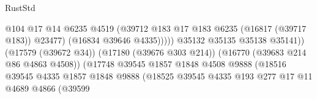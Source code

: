 \begin{lexlean}{RustStd}
\begin{coremodule}
                                                            @104
                                                            @17
                                                            @14
                                                            @6235
                                                            @4519
                                                            (@39712
                                                              @183
                                                              @17
                                                              @183
                                                              @6235
                                                              (@16817 (@39717 @183))
                                                              @23477)
                                                            (@16834 @39646 @4335)))))
                                                    @35132
                                                    @35135
                                                    @35138
                                                    @35141))
                                                (@17579 (@39672 @34))
                                                (@17180 (@39676 @303 @214))
                                                (@16770 (@39683 @214 @86 @4863 @4508))
                                                (@17748
                                                  @39545
                                                  @1857
                                                  @1848
                                                  @4508
                                                  @9888
                                                  (@18516
                                                    @39545
                                                    @4335
                                                    @1857
                                                    @1848
                                                    @9888
                                                    (@18525
                                                      @39545
                                                      @4335
                                                      @193
                                                      @277
                                                      @17
                                                      @11
                                                      @4689
                                                      @4866
                                                      (@39599

\end{coremodule}
\end{lexlean}
